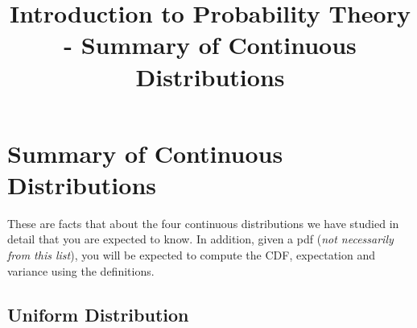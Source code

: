 \documentclass[12pt]{article} %
\title{Introduction to Probability Theory - Summary of Continuous Distributions}
\begin{document}
\maketitle

\section{Summary of Continuous Distributions}
These are facts that about the four continuous distributions we have studied in detail that you are expected to know. In addition, given a pdf (\emph{not necessarily from this list}), you will be expected to compute the CDF, expectation and variance using the definitions.
\subsection{Uniform Distribution}
\end{document}
